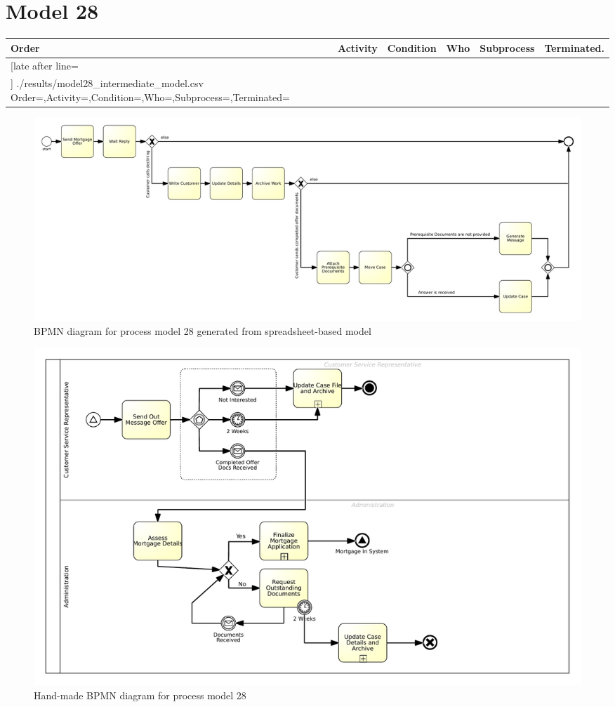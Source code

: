 \section{Model 28}
\begin{tcolorbox}[
	breakable,
	arc=0mm,
	left=1pt,
	right = 1pt,
	boxrule=0mm,
	colback = {white},
	]
	\texttt{}
\end{tcolorbox}
\label{txt:model28}

{\scriptsize
	\begin{longtable}{|p{0.03 \hsize}|p{0.25 \hsize}|p{0.15 \hsize}|p{0.2 \hsize}|p{0.1 \hsize}|p{0.1 \hsize}|}
		\hline
		Order & Activity & Condition & Who & Subprocess & Terminated.
		\\\hline\hline
		\csvreader[late after line=\\\hline]
		{./results/model28_intermediate_model.csv}
		{Order=\Order,Activity=\Activity,Condition=\Condition,Who=\Who,Subprocess=\Subprocess,Terminated=\Terminated}
		{\Order & \Activity & \Condition & \Who & \Subprocess & \Terminated}
		\caption{Spreadsheet-based description for process model 28}
		\label{csv:model28}
	\end{longtable}
}

\begin{figure}[H]
	\centering
	\includegraphics[width=\hsize]{./generated_bpmn/model28.pdf}
	\caption{BPMN diagram for process model 28 generated from spreadsheet-based model}
	\label{bpmn:generated_model28}
\end{figure}

\begin{figure}[H]
	\centering
	\includegraphics[width=\hsize]{./bpmn/model28.pdf}
	\caption{Hand-made BPMN diagram for process model 28}
	\label{bpmn:model28}
\end{figure}

